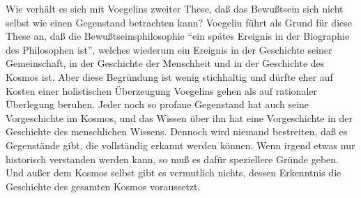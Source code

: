 Wie verhält es sich mit Voegelins zweiter These, daß das Bewußtsein sich nicht
selbst wie einen Gegenstand betrachten kann? Voegelin führt als Grund für
diese These an, daß die Bewußtseinsphilosophie "`ein spätes Ereignis in der
Biographie des Philosophen ist"', welches wiederum ein Ereignis in der
Geschichte seiner Gemeinschaft, in der Geschichte der Menschheit und in der
Geschichte des Kosmos ist. Aber diese Begründung ist wenig stichhaltig und
dürfte eher auf Kosten einer holistischen Überzeugung Voegelins gehen als auf
rationaler Überlegung beruhen. Jeder noch so profane Gegenstand hat auch seine
Vorgeschichte im Kosmos, und das Wissen über ihn hat eine Vorgeschichte in der
Geschichte des menschlichen Wissens. Dennoch wird niemand bestreiten, daß es
Gegenstände gibt, die vollständig erkannt werden können. Wenn irgend etwas nur
historisch verstanden werden kann, so muß es dafür speziellere Gründe geben.
Und außer dem Kosmos selbst gibt es vermutlich nichts, dessen Erkenntnis die
Geschichte des gesamten Kosmos voraussetzt.

